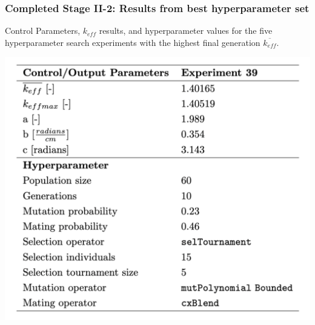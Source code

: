 \begin{frame}
    \frametitle{Completed Stage II-2: Results from best hyperparameter set}
    \begin{table}
        \caption{Control Parameters, $k_{eff}$ results, and hyperparameter values for 
        the five hyperparameter search experiments with the highest final generation 
        $\overline{k_{eff}}$.}
        \includegraphics[width=0.85\linewidth]{figures/rollo-demo-best.png} 
    \end{table}
\end{frame}

